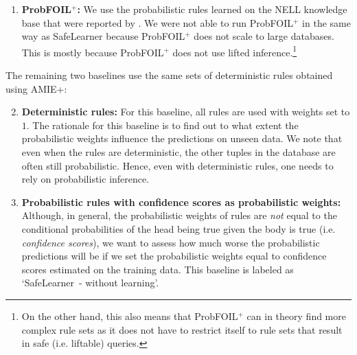 \documentclass[akbc,twoside,11pt]{article}
\newcommand{\algorithmname}{SafeLearner\xspace}
\begin{document}
\begin{enumerate}
    \item {\bf ProbFOIL$^+$:} We use the probabilistic rules learned on the NELL knowledge base that were reported by \citet{DBLP:conf/ijcai/RaedtDTBV15}. We were not able to run ProbFOIL$^+$ in the same way as \algorithmname because ProbFOIL$^+$ does not scale to large databases. This is mostly because ProbFOIL$^+$ does not use lifted inference.\footnote{On the other hand, this also means that ProbFOIL$^+$ can in theory find more complex rule sets as it does not have to restrict itself to rule sets that result in safe (i.e. liftable) queries.}
\end{enumerate}


\noindent The remaining two baselines use the same sets of deterministic rules obtained using AMIE+:

\begin{enumerate}
    \setcounter{enumi}{1}
    \item {\bf Deterministic rules:} For this baseline, all rules are used with weights set to $1$. The rationale for this baseline is to find out to what extent the probabilistic weights influence the predictions on unseen data. We note that even when the rules are deterministic, the other tuples in the database are often still probabilistic. Hence, even with deterministic rules, one needs to rely on probabilistic inference. %
    \item {\bf Probabilistic rules with confidence scores as probabilistic weights:} Although, in general, the probabilistic weights of rules are {\em not} equal to the conditional probabilities of the head being true given the body is true (i.e. {\em confidence scores}), we want to assess how much worse the probabilistic predictions will be if we set the probabilistic weights equal to confidence scores estimated on the training data. This baseline is labeled as `\algorithmname\ - without learning'.
\end{enumerate}
\end{document}
